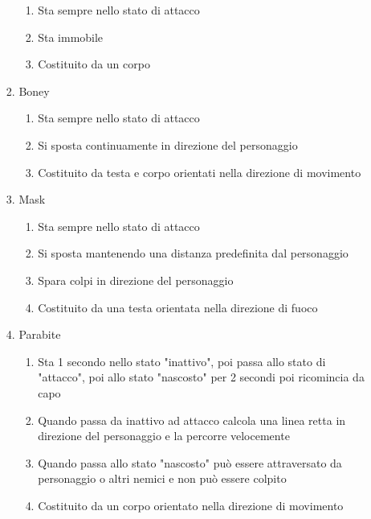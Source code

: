 \begin{enumerate}
\begin{enumerate}
\begin{enumerate}
\begin{enumerate}
                        \item Sta sempre nello stato di attacco
                        \item Sta immobile
                        \item Costituito da un corpo
                    \end{enumerate}
                \item Boney
                    \begin{enumerate}
                        \item Sta sempre nello stato di attacco
                        \item Si sposta continuamente in direzione del personaggio
                        \item Costituito da testa e corpo orientati nella direzione di movimento
                    \end{enumerate}
                \item Mask
                    \begin{enumerate}
                        \item Sta sempre nello stato di attacco
                        \item Si sposta mantenendo una distanza predefinita dal personaggio
                        \item Spara colpi in direzione del personaggio
                        \item Costituito da una testa orientata nella direzione di fuoco
                    \end{enumerate}
                \item Parabite
                    \begin{enumerate}
                        \item Sta 1 secondo nello stato "inattivo", poi passa allo stato di "attacco", poi allo stato "nascosto" per 2 secondi poi ricomincia da capo
                        \item Quando passa da inattivo ad attacco calcola una linea retta in direzione del personaggio e la percorre velocemente
                        \item Quando passa allo stato "nascosto" può essere attraversato da personaggio o altri nemici e non può essere colpito
                        \item Costituito da un corpo orientato nella direzione di movimento
                    \end{enumerate}
            \end{enumerate}

\end{enumerate}
\end{enumerate}
